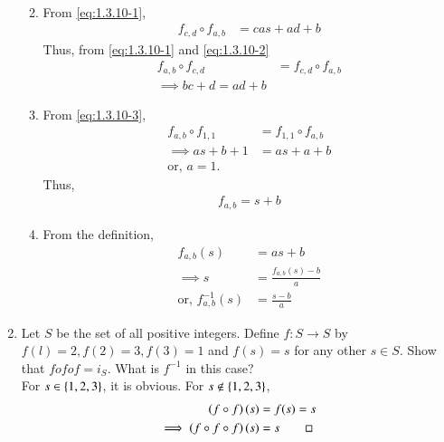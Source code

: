 \begin{enumerate}[label=\arabic*.,ref=\thesubsection.\theenumi]
\begin{enumerate}
\begin{align}
		\end{align}
	\item  From
			\eqref{eq:1.3.10-1},
		\begin{align}
			\label{eq:1.3.10-2}
			f_{c,d}\circ f_{a,b} 
			&=cas+ad+ b
		\end{align}
		Thus, from 
			\eqref{eq:1.3.10-1}
			and 
			\eqref{eq:1.3.10-2}
		\begin{align}
			f_{a,b} \circ f_{c,d} &= f_{c,d} \circ f_{a,b} 
			\\
			\implies bc+d = ad+b
			\label{eq:1.3.10-3}
		\end{align}
	\item  From 
			\eqref{eq:1.3.10-3},
		\begin{align}
			f_{a,b} \circ f_{1,1} &= f_{1,1} \circ f_{a,b}
			\\
			\implies as+b+1 &= as+a+b
			\\
			\text{or, } a = 1.
		\end{align}
		Thus, 
		\begin{align}
			f_{a,b}  = s+b
		\end{align}
	\item  From the definition,
		\begin{align}
			f_{a,b}(s)  &= as+b
			\\
			\implies s &=\frac{f_{a,b}(s) -b}{a}
			\\
			\text{or, }f^{-1}_{a,b}(s) &= \frac{s-b}{a}
		\end{align}
\end{enumerate}
\item Let $S$ be the set of all positive integers. Define $f: S  \rightarrow S$ by $f(l) = 2, f(2) = 3, f(3) = 1$ and $f(s) = s$ for any other $s \in S$. Show that $f o f o f = i_S$. What is $f^{-1}$ in this case?
	\\
	\solution For
$s \in \left\{1,2,3\right\}$, it is obvious.  For
	$s \notin \left\{1,2,3\right\}$,
		\begin{align}
			\left(f\circ f\right) (s) &= f(s) = s
			\\
			\implies \left(f\circ f\circ f\right) (s) &=  s \qed
		\end{align}

\end{enumerate}
